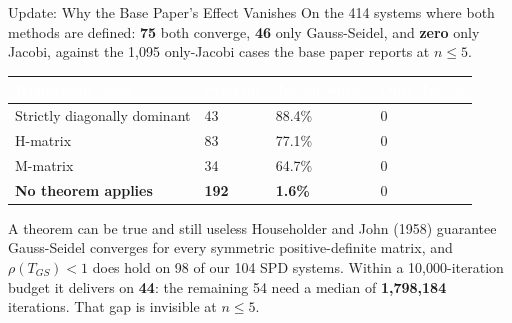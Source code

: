 \documentclass[aspectratio=169,10pt]{beamer}
\newcommand{\gd}[1]{{\color{LSgreen}\bfseries #1}}
\newcommand{\hdrow}{\rowcolor{LSnavy}}
\newcommand{\hdtxt}[1]{\textcolor{white}{\bfseries #1}}
\begin{document}
\begin{frame}{Update: Why the Base Paper's Effect Vanishes}
  \small
  On the 414 systems where both methods are defined: \textbf{75} both converge,
  \textbf{46} only Gauss-Seidel, and \gd{zero} only Jacobi, against the 1{,}095 only-Jacobi
  cases the base paper reports at $n \le 5$.
  \vspace{0.5em}
  \begin{center}
  \renewcommand{\arraystretch}{1.2}
  \begin{tabular}{@{}p{5.4cm}p{1.6cm}p{2.5cm}p{2.5cm}@{}}
    \toprule
    \hdrow \hdtxt{Hypothesis class} & \hdtxt{Systems} & \hdtxt{Jacobi works} & \hdtxt{Only-Jacobi}\\
    \midrule
    Strictly diagonally dominant & 43 & 88.4\% & 0\\
    \rowcolor{LSlight}
    H-matrix & 83 & 77.1\% & 0\\
    M-matrix & 34 & 64.7\% & 0\\
    \rowcolor{LSlight}
    \textbf{No theorem applies} & \textbf{192} & \textcolor{LSred}{\bfseries 1.6\%} & 0\\
    \bottomrule
  \end{tabular}
  \end{center}
  \vspace{0.55em}
  \begin{block}{\small A theorem can be true and still useless}
    \footnotesize Householder and John (1958) guarantee Gauss-Seidel converges for every
    symmetric positive-definite matrix, and $\rho(T_{GS}) < 1$ does hold on 98 of our 104 SPD
    systems. Within a 10{,}000-iteration budget it delivers on \textbf{44}: the remaining 54
    need a median of \textbf{1{,}798{,}184} iterations. That gap is invisible at $n \le 5$.
  \end{block}
\end{frame}
\end{document}
